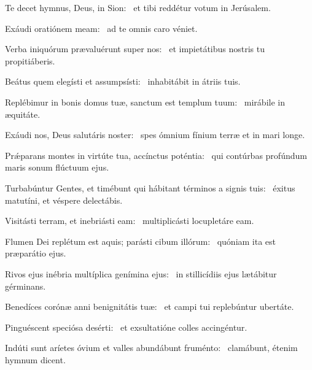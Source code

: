 \item Te decet hymnus, Deus, in Sion:~\psstar{} et tibi reddétur votum in Jerúsalem.

\item Exáudi oratiónem meam:~\psstar{} ad te omnis caro véniet.

\item Verba iniquórum prævaluérunt super nos:~\psstar{} et impietátibus nostris tu propitiáberis.

\item Beátus quem elegísti et assumpsísti:~\psstar{} inhabitábit in átriis tuis.

\item Replébimur in bonis domus tuæ, sanctum est templum tuum:~\psstar{} mirábile in æquitáte.

\item Exáudi nos, Deus salutáris noster:~\psstar{} spes ómnium fínium terræ et in mari longe.

\item Prǽparans montes in virtúte tua, accínctus poténtia:~\psstar{} qui contúrbas profúndum maris sonum flúctuum ejus.

\item Turbabúntur Gentes, et timébunt qui hábitant términos a signis tuis:~\psstar{} éxitus matutíni, et véspere delectábis.

\item Visitásti terram, et inebriásti eam:~\psstar{} multiplicásti locupletáre eam.

\item Flumen Dei replétum est aquis; parásti cibum illórum:~\psstar{} quóniam ita est præparátio ejus.

\item Rivos ejus inébria multíplica genímina ejus:~\psstar{} in stillicídiis ejus lætábitur gérminans.

\item Benedíces corónæ anni benignitátis tuæ:~\psstar{} et campi tui replebúntur ubertáte.

\item Pinguéscent speciósa desérti:~\psstar{} et exsultatióne colles accingéntur.

\item Indúti sunt aríetes óvium et valles abundábunt fruménto:~\psstar{} clamábunt, étenim hymnum dicent.
